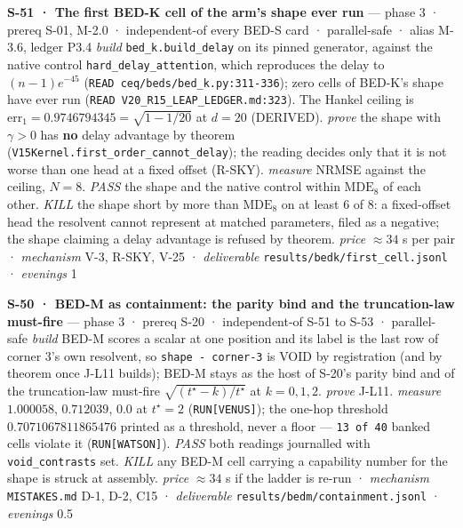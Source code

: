 \documentclass[11pt,a4paper]{article}
\theoremstyle{plain}
\theoremstyle{definition}
\theoremstyle{remark}
\begin{document}
\textbf{S-51 · The first BED-K cell of the arm's shape ever run} ---
phase 3 · prereq S-01, M-2.0 · independent-of every BED-S card ·
parallel-safe · alias M-3.6, ledger P3.4 \emph{build}
\texttt{bed\_k.build\_delay} on its pinned generator, against the native
control \texttt{hard\_delay\_attention}, which reproduces the delay to
\((n-1)e^{-45}\) (\texttt{READ\ ceq/beds/bed\_k.py:311-336}); zero cells
of BED-K's shape have ever run
(\texttt{READ\ V20\_R15\_LEAP\_LEDGER.md:323}). The Hankel ceiling is
\(\mathrm{err}_1=0.9746794345=\sqrt{1-1/20}\) at \(d=20\) (DERIVED).
\emph{prove} the shape with \(\gamma>0\) has \textbf{no} delay advantage
by theorem (\texttt{V15Kernel.first\_order\_cannot\_delay}); the reading
decides only that it is not worse than one head at a fixed offset
(R-SKY). \emph{measure} NRMSE against the ceiling, \(N=8\). \emph{PASS}
the shape and the native control within \(\mathrm{MDE}_8\) of each
other. \emph{KILL} the shape short by more than \(\mathrm{MDE}_8\) on at
least 6 of 8: a fixed-offset head the resolvent cannot represent at
matched parameters, filed as a negative; the shape claiming a delay
advantage is refused by theorem. \emph{price} \(\approx34\) s per pair ·
\emph{mechanism} V-3, R-SKY, V-25 · \emph{deliverable}
\texttt{results/bedk/first\_cell.jsonl} · \emph{evenings} 1

\textbf{S-50 · BED-M as containment: the parity bind and the
truncation-law must-fire} --- phase 3 · prereq S-20 · independent-of
S-51 to S-53 · parallel-safe \emph{build} BED-M scores a scalar at one
position and its label is the last row of corner 3's own resolvent, so
\texttt{shape\ -\ corner-3} is VOID by registration (and by theorem once
J-L11 builds); BED-M stays as the host of S-20's parity bind and of the
truncation-law must-fire \(\sqrt{(t^\star-k)/t^\star}\) at \(k=0,1,2\).
\emph{prove} J-L11. \emph{measure} \(1.000058\), \(0.712039\), \(0.0\)
at \(t^\star=2\) (\texttt{RUN{[}VENUS{]}}); the one-hop threshold
\(0.7071067811865476\) printed as a threshold, never a floor ---
\texttt{13\ of\ 40} banked cells violate it (\texttt{RUN{[}WATSON{]}}).
\emph{PASS} both readings journalled with \texttt{void\_contrasts} set.
\emph{KILL} any BED-M cell carrying a capability number for the shape is
struck at assembly. \emph{price} \(\approx34\) s if the ladder is re-run
· \emph{mechanism} \texttt{MISTAKES.md} D-1, D-2, C15 ·
\emph{deliverable} \texttt{results/bedm/containment.jsonl} ·
\emph{evenings} 0.5
\end{document}
